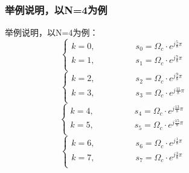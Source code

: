 \documentclass[notheorems,compress,mathserif,table]{beamer}
\begin{document}
\begin{frame}\frametitle{举例说明，以N=4为例}%
举例说明，以N=4为例：
      $$
        \left\{
        \begin{aligned}
        \mbox{$k=0,$} &\quad\quad\quad\quad\mbox{$s_{0}= \Omega_{c}\cdot e^{j\frac{5}{8}\pi}$}\quad\quad\quad\quad\quad\quad\quad\quad\\
        \mbox{$k=1,$} &\quad\quad\quad\quad\mbox{$s_{1}= \Omega_{c}\cdot e^{j\frac{7}{8}\pi}$}\\
        \end{aligned}
        \right.
      $$
      $$
        \left\{
        \begin{aligned}
        \mbox{$k=2,$} &\quad\quad\quad\quad\mbox{$s_{2}= \Omega_{c}\cdot e^{j\frac{9}{8}\pi}$}\quad\quad\quad\quad\quad\quad\quad\quad\\
        \mbox{$k=3,$} &\quad\quad\quad\quad\mbox{$s_{3}= \Omega_{c}\cdot e^{j\frac{11}{8}\pi}$}\\
        \end{aligned}
        \right.
      $$
      $$
        \left\{
        \begin{aligned}
        \mbox{$k=4,$} &\quad\quad\quad\quad\mbox{$s_{4}= \Omega_{c}\cdot e^{j\frac{13}{8}\pi}$}\quad\quad\quad\quad\quad\quad\quad\quad\\
        \mbox{$k=5,$} &\quad\quad\quad\quad\mbox{$s_{5}= \Omega_{c}\cdot e^{j\frac{15}{8}\pi}$}\\
        \end{aligned}
        \right.
      $$
      $$
        \left\{
        \begin{aligned}
        \mbox{$k=6,$} &\quad\quad\quad\quad\mbox{$s_{6}= \Omega_{c}\cdot e^{j\frac{1}{8}\pi}$}\quad\quad\quad\quad\quad\quad\quad\quad\\
        \mbox{$k=7,$} &\quad\quad\quad\quad\mbox{$s_{7}= \Omega_{c}\cdot e^{j\frac{3}{8}\pi}$}\\
        \end{aligned}
        \right.
      $$
      \end{frame}
\end{document}
